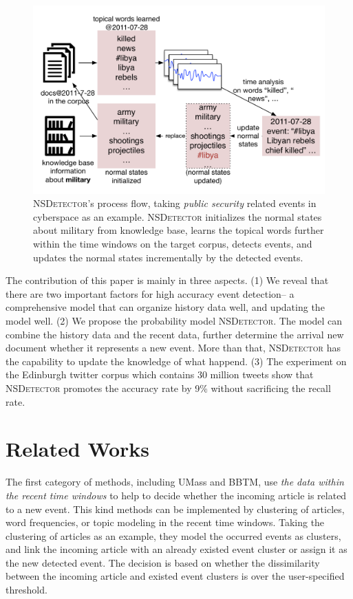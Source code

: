 \documentclass[conference,compsoc]{IEEEtran}
\begin{document}
\begin{figure}[h]
    \includegraphics[width=1.0\columnwidth]{img/NSDetectorExample.pdf}
    \caption{\textsc{NSDetector}'s process flow, taking \textit{public security} related events in cyberspace as an example. \textsc{NSDetector} initializes the normal states about military from knowledge base, learns the topical words further within the time windows on the target corpus, detects events, and updates the normal states incrementally by the detected events.}
    \label{fig:modelDesc}
\end{figure}


The contribution of this paper is mainly in three aspects.
(1) We reveal that there are two important factors for high accuracy event detection-- a comprehensive model that can organize history data well, and updating the model well.
(2) We propose the probability model \textsc{NSDetector}. 
The model can combine the history data and the recent data, further determine the arrival new document whether it represents a new event. 
More than that, \textsc{NSDetector} has the capability to update the knowledge of what happend.
(3) The experiment on the Edinburgh twitter corpus which contains 30 million tweets show that \textsc{NSDetector} promotes the accuracy rate by 9\% without sacrificing the recall rate.


\section{Related Works}
The first category of methods, including UMass\cite{Allan:2000wu} and BBTM\cite{yan2015probabilistic}, use \textit{the data within the recent time windows} to help to decide whether the incoming article is related to a new event. 
This kind methods can be implemented by clustering of articles\cite{Allan:2000wu}\cite{Petrovic:2010uj}\cite{Wurzer:2015wq}, word frequencies\cite{Mathioudakis:2010fc}\cite{Weng:2011wz}, or topic modeling\cite{Diao:2012wj}\cite{Yan:2015wm} in the recent time windows. 
Taking the clustering of articles as an example, they model the occurred events as clusters, and link the incoming article with an already existed event cluster or assign it as the new detected event.
The decision is based on whether the dissimilarity between the incoming article and existed event clusters is over the user-specified threshold. 
\end{document}
